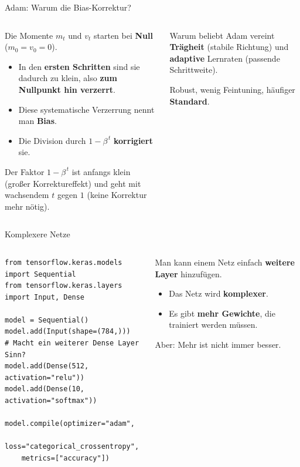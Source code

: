 \begin{frame}{Adam: Warum die Bias-Korrektur?}
\begin{columns}
\begin{column}{0.60\textwidth}
Die Momente $m_t$ und $v_t$ starten bei \textbf{Null} ($m_0 = v_0 = 0$).
\begin{itemize}
\item In den \textbf{ersten Schritten} sind sie dadurch zu klein, also \textbf{zum Nullpunkt hin verzerrt}.
\item Diese systematische Verzerrung nennt man \textbf{Bias}.
\item Die Division durch $1 - \beta^{\,t}$ \textbf{korrigiert} sie.
\end{itemize}

\vspace{0.3em}
Der Faktor $1 - \beta^{\,t}$ ist anfangs klein (großer Korrektureffekt) und geht mit wachsendem $t$ gegen $1$ (keine Korrektur mehr nötig).
\end{column}
\begin{column}{0.35\textwidth}
\begin{block}{Warum beliebt}
Adam vereint \textbf{Trägheit} (stabile Richtung) und \textbf{adaptive} Lernraten (passende Schrittweite).
\end{block}
Robust, wenig Feintuning, häufiger \textbf{Standard}.
\end{column}
\end{columns}
\end{frame}

\makequizpage{\QUIZURL}{\QUIZQRCODE}{\QUIZIMAGE}
\makequestionspage{\FRAGENIMAGE}


\begin{frame}[fragile]{Komplexere Netze}
\begin{columns}
\begin{column}{0.60\textwidth}
\begin{verbatim}
from tensorflow.keras.models import Sequential
from tensorflow.keras.layers import Input, Dense

model = Sequential()
model.add(Input(shape=(784,)))
# Macht ein weiterer Dense Layer Sinn?
model.add(Dense(512, activation="relu"))
model.add(Dense(10, activation="softmax"))

model.compile(optimizer="adam",
    loss="categorical_crossentropy",
    metrics=["accuracy"])
\end{verbatim}
\end{column}
\begin{column}{0.35\textwidth}
Man kann einem Netz einfach \textbf{weitere Layer} hinzufügen.
\begin{itemize}
\item Das Netz wird \textbf{komplexer}.
\item Es gibt \textbf{mehr Gewichte}, die trainiert werden müssen.
\end{itemize}
Aber: Mehr ist nicht immer besser.
\end{column}
\end{columns}
\end{frame}

